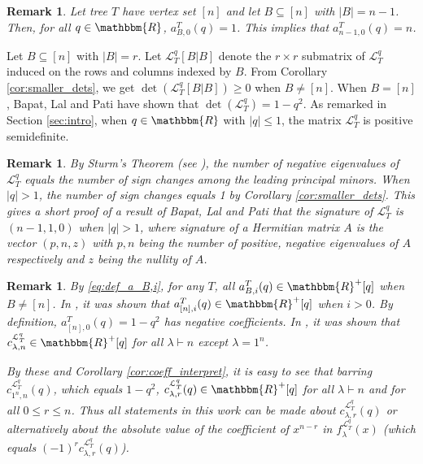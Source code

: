 \documentclass[12pt]{article}
\newtheorem{remark}[theorem]{Remark}
\newcommand{\sL}{  \mathcal{ L}}
\newcommand{\RR}{ \mathbbm{R}}
\begin{document}
\begin{remark}
Let tree $T$ have vertex set $[n]$ and let $B\subseteq [n]$ with $|B|=n-1$. 
Then, for all $q\in \RR$, $a_{B,0}^T(q)=1$. 
This implies that $a_{n-1,0}^T(q)=n$. 
\end{remark}

Let $B \subseteq [n]$ with $|B| = r$.  Let $\sL_T^q[B|B]$ denote the 
$r \times r$ 
submatrix of $\sL_T^q$ induced on the rows and columns indexed by $B$.
From Corollary \ref{cor:smaller_dets}, we get $\det(\sL_T^q[B|B]) 
\geq 0$ when $B \neq [n]$.
When $B = [n]$, Bapat, Lal and Pati \cite{bapat-lal-pati} have shown 
that $\det(\sL_T^q) = 1-q^2$.
As remarked in Section \ref{sec:intro}, when $q \in \RR$ with $|q| \leq 1$, 
the matrix $\sL_T^q$ is positive semidefinite.  



\begin{remark}
\label{rem:sturm_thm}
By Sturm's Theorem (see \cite{godunov-modern-linear-algebra}), the number of 
negative eigenvalues of $\sL_T^q$ equals the number of sign changes among
the leading principal minors.   When $|q| > 1$,  the number of sign
changes equals 1 by Corollary \ref{cor:smaller_dets}.
This gives a short proof of a result of Bapat, Lal and Pati 
\cite[Proposition 3.7]{bapat-lal-pati} that the signature of $\sL_T^q$ is 
$(n-1,1,0)$ when $|q| > 1$, where signature of a Hermitian matrix
$A$ is the vector $(p,n,z)$ with $p,n$ being the number of 
positive, negative eigenvalues of $A$  respectively
and $z$ being the nullity of $A$.
\end{remark}


\begin{remark}
By \eqref{eq:def_a_B,i},
for any $T$, all $a_{B,i}^T(q) \in \RR^+[q]$
when $B \not= [n]$. In \cite[Corollary 13]{mukesh-siva-hook}, 
it was shown that $a_{[n],i}^T(q) \in \RR^+[q]$ 
when $i > 0$.  By definition, 
$a_{[n],0}^T(q) = 1-q^2$ has negative coefficients.  
In \cite[Theorem 2.4]{mukesh-siva-hook}, it was shown
that $c_{\lambda,n}^{\sL_T^q} \in \RR^+[q]$ for all
$\lambda \vdash n$ except $\lambda = 1^n$.


By these and  Corollary \ref{cor:coeff_interpret}, it is easy to see 
that 
barring $c_{1^n,n}^{\sL_T^q}(q)$, which equals $1-q^2$,
$c_{\lambda,r}^{\sL_T^q}(q) \in \RR^+[q]$
for all $\lambda \vdash n$ and for all $0\leq r \leq n$.
Thus all statements in this work can be made about 
$c_{\lambda,r}^{\sL_T^q}(q)$ or alternatively about    
the {\sl absolute value} of the coefficient of $x^{n-r}$ 
in $f_{\lambda}^{\sL_T^q}(x)$
(which equals $(-1)^r c_{\lambda,r}^{\sL_T^q}(q)$). 
\end{remark}
\end{document}
